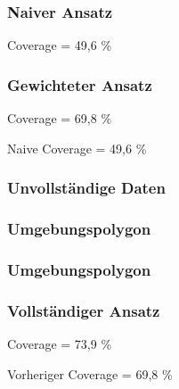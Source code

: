 \begin{frame}
  \frametitle{Naiver Ansatz}
  \begin{center}
  \huge{Coverage = 49,6 \%}
  \end{center}
\end{frame}

\begin{frame}
  \frametitle{Gewichteter Ansatz}
  \begin{center}
  \huge{Coverage = 69,8 \%}
  \end{center}
  \begin{center}
  Naive Coverage = 49,6 \%
  \end{center}
\end{frame}

\begin{frame}
  \frametitle{Unvollständige Daten}
\end{frame}

\begin{frame}
  \frametitle{Umgebungspolygon}
\end{frame}

\begin{frame}
  \frametitle{Umgebungspolygon}
\end{frame}

\begin{frame}
  \frametitle{Vollständiger Ansatz}
  \begin{center}
  \huge{Coverage = 73,9 \%}
  \end{center}
  \begin{center}
  Vorheriger Coverage =  69,8 \%
  \end{center}
\end{frame}

